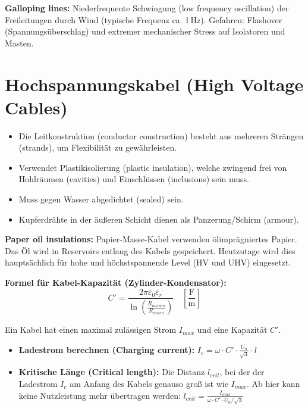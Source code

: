 \documentclass[11pt, a4paper]{article}
\begin{document}
\textbf{Galloping lines:}
Niederfrequente Schwingung (low frequency oscillation) der Freileitungen durch Wind (typische Frequenz ca. 1\,Hz). Gefahren: Flashover (Spannungsüberschlag) und extremer mechanischer Stress auf Isolatoren und Masten.

\section{Hochspannungskabel (High Voltage Cables)}
\begin{itemize}
    \item Die Leitkonstruktion (conductor construction) besteht aus mehreren Strängen (strands), um Flexibilität zu gewährleisten.
    \item Verwendet Plastikisolierung (plastic insulation), welche zwingend frei von Hohlräumen (cavities) und Einschlüssen (inclusions) sein muss.
    \item Muss gegen Wasser abgedichtet (sealed) sein.
    \item Kupferdrähte in der äußeren Schicht dienen als Panzerung/Schirm (armour).
\end{itemize}

\textbf{Paper oil insulations:}
Papier-Masse-Kabel verwenden ölimprägniertes Papier. Das Öl wird in Reservoirs entlang des Kabels gespeichert. Heutzutage wird dies hauptsächlich für hohe und höchstspannende Level (HV und UHV) eingesetzt.

\textbf{Formel für Kabel-Kapazität (Zylinder-Kondensator):}
\begin{equation}
    C' = \frac{2 \pi \varepsilon_0 \varepsilon_r}{\ln\left(\frac{R_{aussen}}{R_{innen}}\right)} \quad \left[ \frac{\text{F}}{\text{m}} \right]
\end{equation}

\begin{tcolorbox}[colback=blue!5, title=\textbf{Beispiel: Ladestrom und kritische Kabellänge}]
Ein Kabel hat einen maximal zulässigen Strom $I_{max}$ und eine Kapazität $C'$.
\begin{itemize}
    \item \textbf{Ladestrom berechnen (Charging current):} $I_c = \omega \cdot C' \cdot \frac{U_n}{\sqrt{3}} \cdot l$
    \item \textbf{Kritische Länge (Critical length):} Die Distanz $l_{crit}$, bei der der Ladestrom $I_c$ am Anfang des Kabels genauso groß ist wie $I_{max}$. Ab hier kann keine Nutzleistung mehr übertragen werden: $l_{crit} = \frac{I_{max}}{\omega \cdot C' \cdot U_n/\sqrt{3}}$
\end{itemize}
\end{tcolorbox}
\end{document}
